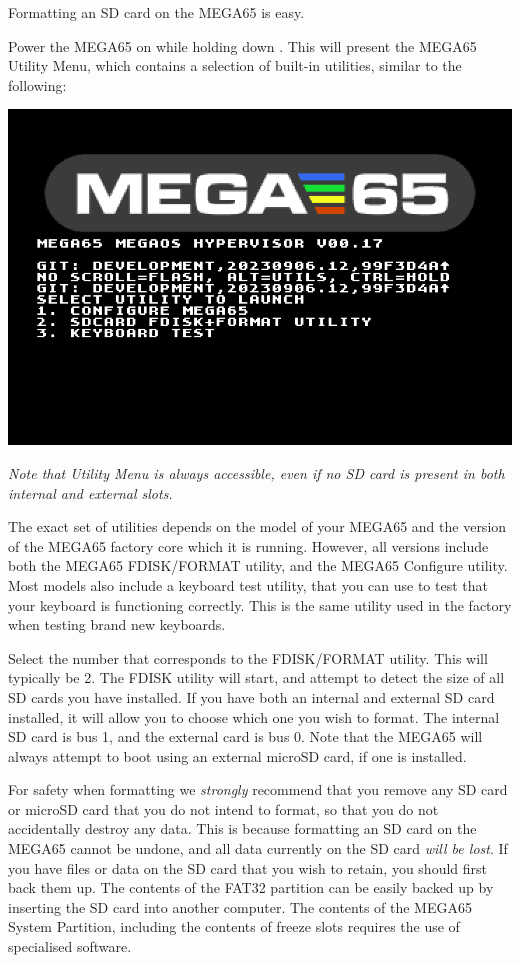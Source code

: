 Formatting an SD card on the MEGA65 is easy.

Power the MEGA65 on while holding down .
This will present the MEGA65 Utility Menu, which contains a
selection of built-in utilities, similar to the following:

\begin{center}
\includegraphics[width=0.7\linewidth]{images/ss-utilmenu.png}
\end{center}

{\em Note that Utility Menu is always accessible, even if no SD card is present in both internal and external slots.}

The exact set of utilities
depends on the model of your MEGA65 and the version of the MEGA65
factory core which it is running. However, all versions include both
the MEGA65 FDISK/FORMAT utility, and the MEGA65 Configure utility.
Most models also include a keyboard test utility, that you can use
to test that your keyboard is functioning correctly.  This is
the same utility used in the factory when testing brand
new keyboards.

Select the number that corresponds to the FDISK/FORMAT utility.  This
will typically be 2.  The FDISK utility will start, and attempt to
detect the size of all SD cards you have installed.  If you have both
an internal and external SD card installed, it will allow you to
choose which one you wish to format. The internal SD card is bus 1,
and the external card is bus 0.  Note that the MEGA65 will
always attempt to boot using an external microSD card, if one is
installed.

For safety when formatting we {\em strongly} recommend
that you remove any SD card or microSD card that you do not intend to
format, so that you do not accidentally destroy any data.  This is
because formatting an SD card on the MEGA65 cannot be undone, and
all data currently on the SD card {\em will be lost}.  If you
have files or data on the SD card that you wish to retain, you
should first back them up.  The contents of the FAT32
partition can be easily backed up by inserting the SD card into
another computer.  The contents of the MEGA65 System Partition,
including the contents of freeze slots requires the use of specialised
software.

